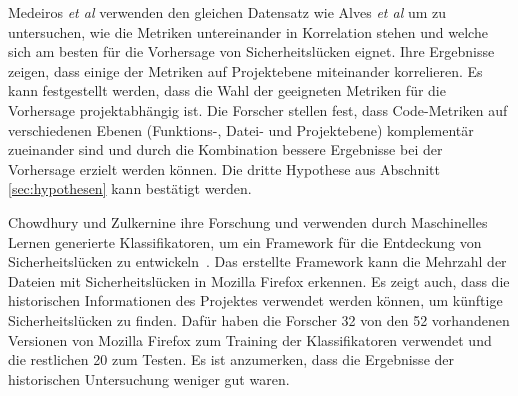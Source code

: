 Medeiros \emph{et al} \cite{medeiros_et_al} verwenden den gleichen Datensatz wie Alves \emph{et al} \cite{alves_et_al} um zu untersuchen, wie die Metriken untereinander in Korrelation stehen und welche sich am besten für die Vorhersage von Sicherheitslücken eignet.
Ihre Ergebnisse zeigen, dass einige der Metriken auf Projektebene miteinander korrelieren.
Es kann festgestellt werden, dass die Wahl der geeigneten Metriken für die Vorhersage projektabhängig ist.
Die Forscher stellen fest, dass Code-Metriken auf verschiedenen Ebenen (Funktions-, Datei- und Projektebene) komplementär zueinander sind und durch die Kombination bessere Ergebnisse bei der Vorhersage erzielt werden können.
Die dritte Hypothese aus Abschnitt \ref{sec:hypothesen} kann bestätigt werden.

Chowdhury und Zulkernine ihre Forschung und verwenden durch Maschinelles Lernen generierte Klassifikatoren, um ein Framework für die Entdeckung von Sicherheitslücken zu entwickeln~\cite{chowdhury_zulkernine_2009,chowdhury_zulkernine_2010}.
Das erstellte Framework kann die Mehrzahl der Dateien mit Sicherheitslücken in Mozilla Firefox erkennen.
Es zeigt auch, dass die historischen Informationen des Projektes verwendet werden können, um künftige Sicherheitslücken zu finden.
Dafür haben die Forscher 32 von den 52 vorhandenen Versionen von Mozilla Firefox zum Training der Klassifikatoren verwendet und die restlichen 20 zum Testen.
Es ist anzumerken, dass die Ergebnisse der historischen Untersuchung weniger gut waren.
